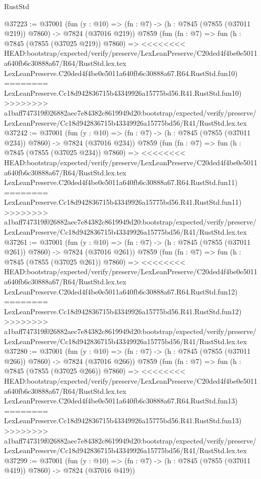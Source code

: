 \begin{lexlean}{RustStd}
\begin{coremodule}
{\begin{coremodule}
{{{{{{{{{{{{{{{{{{{{{{{{{{{{{{{{{{{{{{{{{{{{{{{{{{{{{{@37223 := @37001
    (fun (y : @10) => (fn : @7) -> (h : @7845 (@7855 (@37011 @219)) @7860) -> @7824 (@37016 @219))
    @7859
    (fun (fn : @7) =>
    fun (h : @7845 (@7855 (@37025 @219)) @7860) =>
<<<<<<<< HEAD:bootstrap/expected/verify/preserve/LexLeanPreserve/C20ded4f4be0e5011a640fb6c30888a67/R64/RustStd.lex.tex
    LexLeanPreserve.C20ded4f4be0e5011a640fb6c30888a67.R64.RustStd.fun10)
========
    LexLeanPreserve.Cc18d942836715b43349926a15775bd56.R41.RustStd.fun10)
>>>>>>>> a1baff747319f026882aec7e84382c8619949d20:bootstrap/expected/verify/preserve/LexLeanPreserve/Cc18d942836715b43349926a15775bd56/R41/RustStd.lex.tex
@37242 := @37001
    (fun (y : @10) => (fn : @7) -> (h : @7845 (@7855 (@37011 @234)) @7860) -> @7824 (@37016 @234))
    @7859
    (fun (fn : @7) =>
    fun (h : @7845 (@7855 (@37025 @234)) @7860) =>
<<<<<<<< HEAD:bootstrap/expected/verify/preserve/LexLeanPreserve/C20ded4f4be0e5011a640fb6c30888a67/R64/RustStd.lex.tex
    LexLeanPreserve.C20ded4f4be0e5011a640fb6c30888a67.R64.RustStd.fun11)
========
    LexLeanPreserve.Cc18d942836715b43349926a15775bd56.R41.RustStd.fun11)
>>>>>>>> a1baff747319f026882aec7e84382c8619949d20:bootstrap/expected/verify/preserve/LexLeanPreserve/Cc18d942836715b43349926a15775bd56/R41/RustStd.lex.tex
@37261 := @37001
    (fun (y : @10) => (fn : @7) -> (h : @7845 (@7855 (@37011 @261)) @7860) -> @7824 (@37016 @261))
    @7859
    (fun (fn : @7) =>
    fun (h : @7845 (@7855 (@37025 @261)) @7860) =>
<<<<<<<< HEAD:bootstrap/expected/verify/preserve/LexLeanPreserve/C20ded4f4be0e5011a640fb6c30888a67/R64/RustStd.lex.tex
    LexLeanPreserve.C20ded4f4be0e5011a640fb6c30888a67.R64.RustStd.fun12)
========
    LexLeanPreserve.Cc18d942836715b43349926a15775bd56.R41.RustStd.fun12)
>>>>>>>> a1baff747319f026882aec7e84382c8619949d20:bootstrap/expected/verify/preserve/LexLeanPreserve/Cc18d942836715b43349926a15775bd56/R41/RustStd.lex.tex
@37280 := @37001
    (fun (y : @10) => (fn : @7) -> (h : @7845 (@7855 (@37011 @266)) @7860) -> @7824 (@37016 @266))
    @7859
    (fun (fn : @7) =>
    fun (h : @7845 (@7855 (@37025 @266)) @7860) =>
<<<<<<<< HEAD:bootstrap/expected/verify/preserve/LexLeanPreserve/C20ded4f4be0e5011a640fb6c30888a67/R64/RustStd.lex.tex
    LexLeanPreserve.C20ded4f4be0e5011a640fb6c30888a67.R64.RustStd.fun13)
========
    LexLeanPreserve.Cc18d942836715b43349926a15775bd56.R41.RustStd.fun13)
>>>>>>>> a1baff747319f026882aec7e84382c8619949d20:bootstrap/expected/verify/preserve/LexLeanPreserve/Cc18d942836715b43349926a15775bd56/R41/RustStd.lex.tex
@37299 := @37001
    (fun (y : @10) => (fn : @7) -> (h : @7845 (@7855 (@37011 @419)) @7860) -> @7824 (@37016 @419))
}}}}}}}}}}}}}}}}}}}}}}}}}}}}}}}}}}}}}}}}}}}}}}}}}}}}}}
\end{coremodule}}
\end{coremodule}
\end{lexlean}
